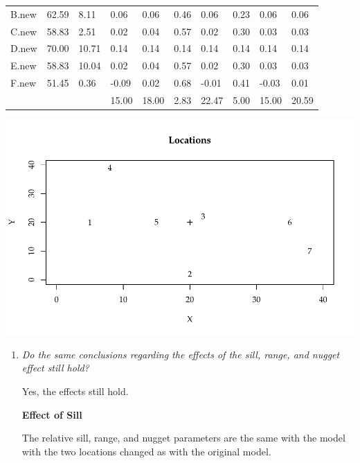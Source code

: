 \documentclass{article}\usepackage[]{graphicx}\usepackage[]{color}
\makeatletter
\def\maxwidth{ %
  \ifdim\Gin@nat@width>\linewidth
    \linewidth
  \else
    \Gin@nat@width
  \fi
}
\newenvironment{knitrout}{}{} %
\makeatother
\begin{document}
\begin{enumerate}
\begin{table}[ht]
\begin{tabular}{||l|l|l|l|l|l|l|l|l|l||}
  B.new & 62.59 & 8.11 & 0.06 & 0.06 & 0.46 & 0.06 & 0.23 & 0.06 & 0.06 \\ 
  C.new & 58.83 & 2.51 & 0.02 & 0.04 & 0.57 & 0.02 & 0.30 & 0.03 & 0.03 \\ 
  D.new & 70.00 & 10.71 & 0.14 & 0.14 & 0.14 & 0.14 & 0.14 & 0.14 & 0.14 \\ 
  E.new & 58.83 & 10.04 & 0.02 & 0.04 & 0.57 & 0.02 & 0.30 & 0.03 & 0.03 \\ 
  F.new & 51.45 & 0.36 & -0.09 & 0.02 & 0.68 & -0.01 & 0.41 & -0.03 & 0.01 \\ 
   &  &  & 15.00 & 18.00 & 2.83 & 22.47 & 5.00 & 15.00 & 20.59 \\ 
   \hline
\end{tabular}
\end{table}


\begin{knitrout}\footnotesize
{}\color{fgcolor}

{\centering \includegraphics[width=\maxwidth]{figure/prob1x-1} 

}



\end{knitrout}

\newpage

\begin{enumerate}
\item %
{\it Do the same conclusions regarding the effects of the sill, range, and nugget effect still hold?}

Yes, the effects still hold.

{\bf Effect of Sill}

The relative sill, range, and nugget parameters are the same with the model with the two locations changed as with the original model. 


\end{enumerate}
\end{enumerate}
\end{document}
